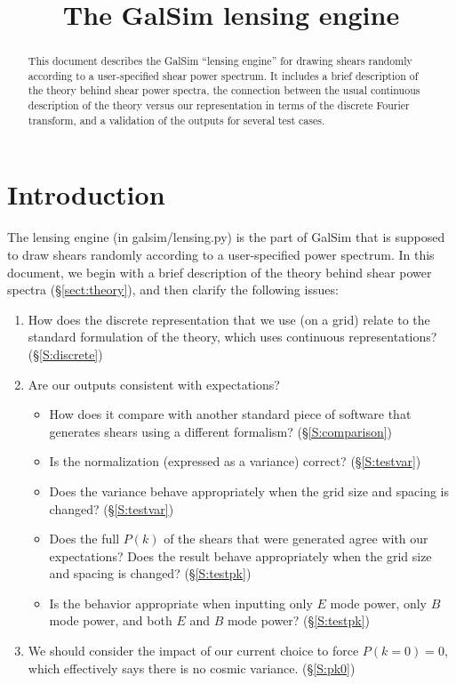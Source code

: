 \documentclass[preprint]{aastex}
\begin{document}
\title{The GalSim lensing engine}

\begin{abstract}
This document describes the GalSim ``lensing engine'' for drawing
shears randomly according to a user-specified shear power spectrum.
It includes a brief description of the theory behind shear power
spectra, the connection between the usual continuous description of
the theory versus our representation in terms of the discrete Fourier
transform, and a validation of the outputs for several test cases.
\end{abstract}

\tableofcontents

\section{Introduction}

The lensing engine (in galsim/lensing.py) is the part of GalSim that
is supposed to draw shears randomly according to a user-specified
power spectrum.  In this document, we begin with a brief description
of the theory behind shear power spectra (\S\ref{sect:theory}), and then clarify the following
issues:
\begin{enumerate}
\item How does the discrete representation that we use (on a grid)
  relate to the standard formulation of the theory, which uses
  continuous representations?  (\S\ref{S:discrete})
\item Are our outputs consistent with expectations?
\begin{itemize}
\item How does it compare with another standard piece of software that
  generates shears using a different formalism? (\S\ref{S:comparison})
\item Is the normalization (expressed as a variance) correct? (\S\ref{S:testvar})
\item Does the variance behave appropriately when the grid size and
  spacing is changed? (\S\ref{S:testvar})
\item Does the full $P(k)$ of the shears that were generated agree
  with our expectations?  Does the result behave appropriately when
  the grid size and spacing is changed? (\S\ref{S:testpk})
\item Is the behavior appropriate when inputting only $E$ mode power,
  only $B$ mode power, and both $E$ and $B$ mode power? (\S\ref{S:testpk})
\end{itemize}
\item We should consider the impact of our current choice to force
  $P(k=0)=0$, which effectively says there is no cosmic variance. (\S\ref{S:pk0})
\end{enumerate}
\end{document}
